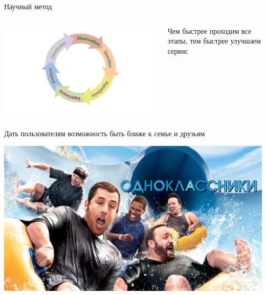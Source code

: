 \documentclass[11pt,aspectratio=169,handout]{beamer}
\begin{document}
\begin{frame}{Научный метод}

\begin{columns}
\begin{column}{0.45\textwidth}   
   \begin{center}
      \includegraphics[scale=0.35]{images/method.jpeg}
    \end{center}
\end{column}
\begin{column}{0.45\textwidth}
    \begin{tcolorbox}[colback=gray!5,colframe=gray!80,title=]
       Чем быстрее проходим все этапы, тем быстрее улучшаем сервис
    \end{tcolorbox}
\end{column}
\end{columns}

\end{frame}

\begin{frame}{}

\begin{tcolorbox}[colback=gray!5,colframe=gray!80,title=Миссия компании]
Дать пользователям возможность быть ближе к семье и друзьям
\end{tcolorbox}

\begin{center}
\includegraphics[scale=0.14]{images/odnoklassniki.jpeg}
\end{center}

\end{frame}
\end{document}
